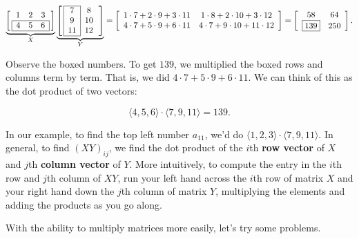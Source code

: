 \documentclass[../gatm.tex]{subfiles}
\begin{document}
\begin{center}
$$\underbrace{\left[\,\begin{array}{ccc}
1                      & 2 & 3                      \\ \hline
\multicolumn{1}{|l}{4} & 5 & \multicolumn{1}{l|}{6} \\ \hline
\end{array}\,\right]}_{X}\underbrace{\left[\,\begin{array}{|c|c}
\cline{1-1}
7  & 8  \\
9  & 10 \\
11 & 12 \\ \cline{1-1}
\end{array}\,\right]}_{Y}=\left[\begin{array}{cc}
1\cdot 7 + 2\cdot 9 + 3\cdot 11 & 1\cdot 8 + 2\cdot 10 + 3\cdot 12 \\
4\cdot 7 + 5\cdot 9 + 6\cdot 11 & 4\cdot 7 + 9\cdot 10 + 11\cdot 12 \\
\end{array}
\right]=\left[\begin{array}{cc}
58 & 64 \\
\boxed{139} & 250 \\
\end{array}\right].$$
\end{center}

\noindent Observe the boxed numbers. To get $139$, we multiplied the boxed rows and columns term by term. That is, we did $4\cdot 7 + 5\cdot 9 + 6\cdot 11$. We can think of this as the dot product of two vectors:

$$\langle 4, 5, 6\rangle \cdot \langle 7, 9, 11\rangle = 139.$$

\noindent In our example, to find the top left number $a_{11}$, we'd do $\langle 1,2,3\rangle \cdot \langle 7,9,11\rangle$. In general, to find $(XY)_{ij}$, we find the dot product of the $i$th \textbf{row vector} of $X$ and $j$th \textbf{column vector} of $Y$. More intuitively, to compute the entry in the $i$th row and $j$th column of $XY$, run your left hand across the $i$th row of matrix $X$ and your right hand down the $j$th column of matrix $Y$, multiplying the elements and adding the products as you go along.

With the ability to multiply matrices more easily, let's try some problems.
\end{document}
